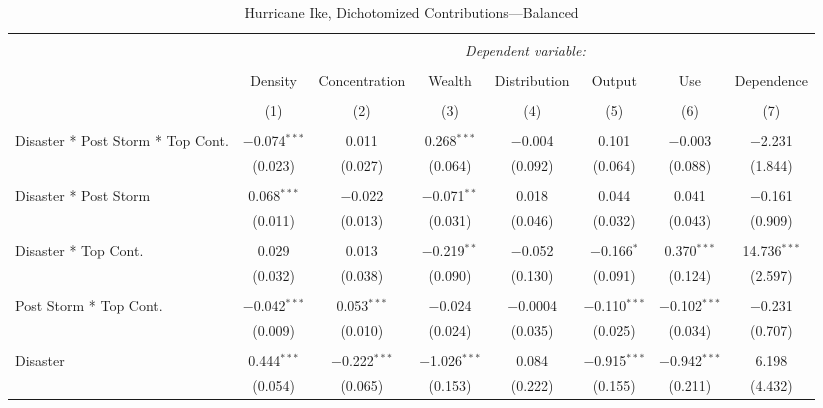
\begin{table}[!htbp] \centering 
  \caption{Hurricane Ike, Dichotomized Contributions---Balanced} 
  \label{} 
\footnotesize 
\begin{tabular}{@{\extracolsep{5pt}}lccccccc} 
\\[-1.8ex]\hline 
\hline \\[-1.8ex] 
 & \multicolumn{7}{c}{\textit{Dependent variable:}} \\ 
\cline{2-8} 
\\[-1.8ex] & Density & Concentration & Wealth & Distribution & Output & Use & Dependence \\ 
\\[-1.8ex] & (1) & (2) & (3) & (4) & (5) & (6) & (7)\\ 
\hline \\[-1.8ex] 
 Disaster * Post Storm * Top Cont. & $-$0.074$^{***}$ & 0.011 & 0.268$^{***}$ & $-$0.004 & 0.101 & $-$0.003 & $-$2.231 \\ 
  & (0.023) & (0.027) & (0.064) & (0.092) & (0.064) & (0.088) & (1.844) \\ 
  & & & & & & & \\ 
 Disaster * Post Storm & 0.068$^{***}$ & $-$0.022 & $-$0.071$^{**}$ & 0.018 & 0.044 & 0.041 & $-$0.161 \\ 
  & (0.011) & (0.013) & (0.031) & (0.046) & (0.032) & (0.043) & (0.909) \\ 
  & & & & & & & \\ 
 Disaster * Top Cont. & 0.029 & 0.013 & $-$0.219$^{**}$ & $-$0.052 & $-$0.166$^{*}$ & 0.370$^{***}$ & 14.736$^{***}$ \\ 
  & (0.032) & (0.038) & (0.090) & (0.130) & (0.091) & (0.124) & (2.597) \\ 
  & & & & & & & \\ 
 Post Storm *  Top Cont. & $-$0.042$^{***}$ & 0.053$^{***}$ & $-$0.024 & $-$0.0004 & $-$0.110$^{***}$ & $-$0.102$^{***}$ & $-$0.231 \\ 
  & (0.009) & (0.010) & (0.024) & (0.035) & (0.025) & (0.034) & (0.707) \\ 
  & & & & & & & \\ 
 Disaster & 0.444$^{***}$ & $-$0.222$^{***}$ & $-$1.026$^{***}$ & 0.084 & $-$0.915$^{***}$ & $-$0.942$^{***}$ & 6.198 \\ 
  & (0.054) & (0.065) & (0.153) & (0.222) & (0.155) & (0.211) & (4.432) \\ 

\end{tabular}
\end{table}
